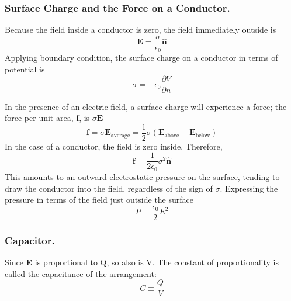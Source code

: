 \documentclass[../../../main.tex]{subfiles}
\begin{document}
\subsubsection{Surface Charge and the Force on a Conductor.} 
Because the field inside a conductor is zero, 
the field immediately outside is
\begin{equation*}
    \mathbf{E}=\frac{\sigma}{\epsilon_0}\mathbf{\hat{n}}
\end{equation*}
Applying boundary condition, the surface charge on a conductor in
terms of potential is
\begin{equation*}
    \sigma=-\epsilon_0\frac{\partial V}{\partial n}
\end{equation*}

In the presence of an electric field, a surface charge will experience a force; the force per unit area, \textbf{f}, is $\sigma\mathbf{E}$
\begin{equation*}
    \mathbf{f}=\sigma\mathbf{E}_{\text{average}}=\frac{1}{2}\sigma(\mathbf{E}_{\text{above}}-\mathbf{E}_{\text{below}})
\end{equation*}
In the case of a conductor, the field is zero inside. Therefore,
    \begin{equation*}
        \mathbf{f}=\frac{1}{2\epsilon_0}\sigma^2\mathbf{\hat{n}}
    \end{equation*} 
This amounts to an outward electrostatic pressure on the surface, tending to draw the conductor into the field, regardless of the sign of $\sigma$. Expressing the pressure in terms of the field just outside the surface
\begin{equation*}
    P=\frac{\epsilon_0}{2}E^2
\end{equation*}

\subsubsection{Capacitor.}
Since \textbf{E} is proportional to Q, so also is V. The constant of proportionality is called the capacitance of the arrangement:
\begin{equation*}
    C\equiv \frac{Q}{V}
\end{equation*}
\end{document}
